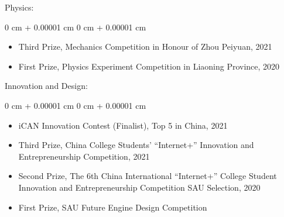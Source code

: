 \documentclass[10pt, letterpaper]{article}
\newenvironment{highlights}{
    \begin{itemize}[
        topsep=0.10 cm,
        parsep=0.10 cm,
        partopsep=0pt,
        itemsep=0pt,
        leftmargin=0 cm + 10pt
    ]
}{
    \end{itemize}
} %
\newenvironment{onecolentry}{
    \begin{adjustwidth}{
        0 cm + 0.00001 cm
    }{
        0 cm + 0.00001 cm
    }
}{
    \end{adjustwidth}
} %
\begin{document}
    \vspace{0.2 cm}

Physics:

    \vspace{0.10 cm}
    \begin{onecolentry}
        \begin{highlights}
            \item Third Prize, Mechanics Competition in Honour of Zhou Peiyuan, 2021
            \item First Prize, Physics Experiment Competition in Liaoning Province, 2020
        \end{highlights}
    \end{onecolentry}

    \vspace{0.2 cm}

Innovation and Design:

    \vspace{0.10 cm}
    \begin{onecolentry}
        \begin{highlights}
            \item iCAN Innovation Contest (Finalist), Top 5 in China, 2021
            \item Third Prize, China College Students' “Internet+” Innovation and Entrepreneurship Competition, 2021
            \item Second Prize, The 6th China International “Internet+” College Student Innovation and Entrepreneurship Competition SAU Selection, 2020
            \item First Prize, SAU Future Engine Design Competition
        \end{highlights}
    \end{onecolentry}
\end{document}

